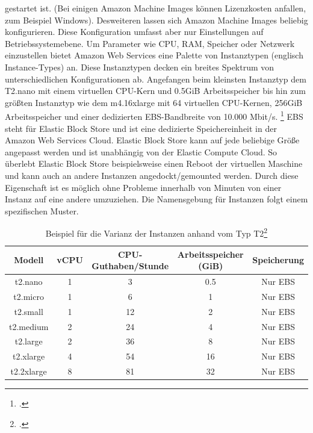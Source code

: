 \documentclass[titlepage]{report}
\begin{document}
gestartet ist. (Bei einigen Amazon Machine Images können Lizenzkosten
anfallen, zum Beispiel Windows). Desweiteren lassen sich Amazon Machine
Images beliebig konfigurieren. Diese Konfiguration umfasst aber nur
Einstellungen auf Betriebssystemebene. Um Parameter wie CPU, RAM,
Speicher oder Netzwerk einzustellen bietet Amazon Web Services eine
Palette von Instanztypen (englisch Instance\hyp{}Types) an.
Diese Instanztypen decken ein breites Spektrum von unterschiedlichen
Konfigurationen ab. Angefangen beim kleinsten Instanztyp dem T2.nano mit
einem virtuellen CPU\hyp{}Kern und 0.5GiB Arbeitsspeicher bis hin zum größten
Instanztyp wie dem m4.16xlarge mit 64 virtuellen CPU\hyp{}Kernen, 256GiB
Arbeitsspeicher und einer dedizierten EBS\hyp{}Bandbreite von 10.000 Mbit/s.
\footcite{instance} EBS steht für Elastic Block Store und ist eine
dedizierte Speichereinheit in der Amazon Web Services Cloud. Elastic
Block Store kann auf jede beliebige Größe angepasst werden und ist
unabhängig von der Elastic Compute Cloud. So überlebt Elastic Block
Store beispielsweise einen Reboot der virtuellen Maschine und kann auch
an andere Instanzen angedockt/gemounted werden. Durch diese Eigenschaft
ist es möglich ohne Probleme innerhalb von Minuten von einer Instanz auf eine andere
umzuziehen. Die Namensgebung für Instanzen folgt einem spezifischen
Muster.
\begin{table}[h]
    \centering
    \caption{Beispiel für die Varianz der Instanzen anhand vom Typ T2\footcite{Instance}}
    \label{tab:1}
\begin{tabular}{|c|c|c|c|c|}
\hline
Modell     & vCPU & CPU\hyp{}Guthaben/Stunde & Arbeitsspeicher (GiB) & Speicherung \\ \hline
t2.nano    & 1    & 3                   & 0.5                   & Nur EBS     \\
t2.micro   & 1    & 6                   & 1                     & Nur EBS     \\
t2.small   & 1    & 12                  & 2                     & Nur EBS     \\
t2.medium  & 2    & 24                  & 4                     & Nur EBS     \\
t2.large   & 2    & 36                  & 8                     & Nur EBS     \\
t2.xlarge  & 4    & 54                  & 16                    & Nur EBS     \\
t2.2xlarge & 8    & 81                  & 32                    & Nur EBS     \\ \hline
\end{tabular}
\end{table}
\end{document}

